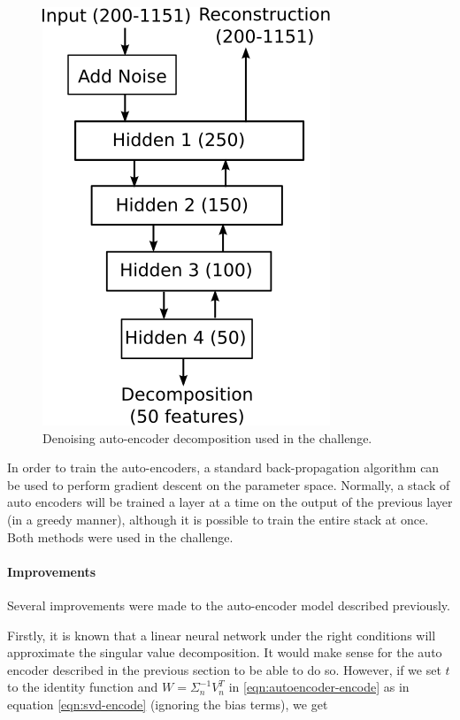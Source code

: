 \documentclass{article}
\begin{document}
\begin{figure}[ht]
\vskip 0.2in
\begin{center}
\centerline{\includegraphics{auto-encoder}}
\caption{Denoising auto-encoder decomposition used in the challenge.}
\label{fig:autoencoder-decomposition}
\end{center}
\vskip -0.2in
\end{figure} 

In order to train the auto-encoders, a standard back-propagation algorithm can be used to perform gradient descent on the parameter space.  Normally, a stack of auto encoders will be trained a layer at a time on the output of the previous layer (in a greedy manner), although it is possible to train the entire stack at once.  Both methods were used in the challenge.

\paragraph{Improvements}

Several improvements were made to the auto-encoder model described previously.

Firstly, it is known that a linear neural network under the right conditions will approximate the singular value decomposition.  It would make sense for the auto encoder described in the previous section to be able to do so.  However, if we set $t$ to the identity function and $W = \Sigma_n^{-1} V_n^T$ in \ref{eqn:autoencoder-encode} as in equation \ref{eqn:svd-encode} (ignoring the bias terms), we get
\end{document}
